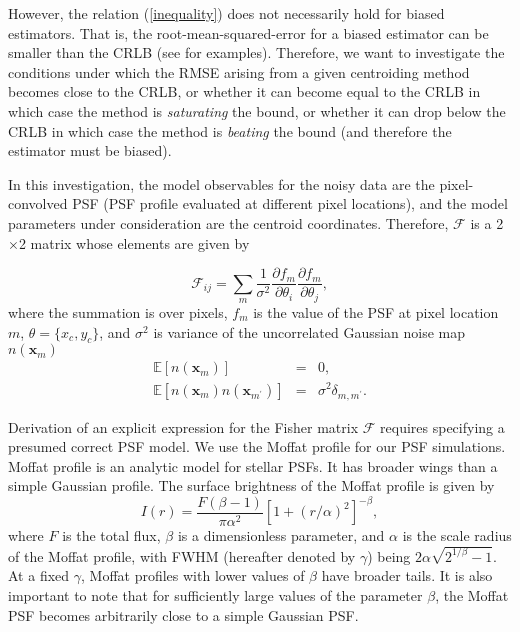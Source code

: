 \documentclass[12pt, preprint]{aastex}
\newcommand{\beq}{\begin{equation}}
\newcommand{\eeq}{\end{equation}}
\begin{document}
However, the relation (\ref{inequality}) does not necessarily hold for biased estimators. That is, 
the root-mean-squared-error for a biased estimator can be smaller than the CRLB (see \citealt{lecam} for examples).
Therefore, we want to investigate the conditions under which the RMSE arising from a given centroiding method 
becomes close to the CRLB, or whether it can become equal to the CRLB in which case the method is \emph{saturating} 
the bound, or whether it can drop below the CRLB in which case the method is \emph{beating} the bound (and therefore the estimator must be biased).   
  
In this investigation, the model observables for the noisy data are the pixel-convolved PSF (PSF profile evaluated at different pixel locations), and  
the model parameters under consideration are the centroid coordinates. Therefore, $\mathcal{F}$
is a 2$\times$2 matrix whose elements are given by

\beq
  \mathcal{F}_{ij} = \sum_{m}\frac{1}{\sigma^{2}}
                \frac{\partial f_{m}}{\partial \theta_{i}}\frac{\partial f_{m}}{\partial \theta_{j}},
\label{fish}
\eeq
where the summation is over pixels, $f_{m}$ is the value of the PSF at pixel location $m$,
$\theta=\{x_{c},y_{c}\}$, and $\sigma^{2}$ is variance of the uncorrelated Gaussian noise map $n(\mathbf{x}_{m})$
\begin{eqnarray}
\mathbb{E}[n(\mathbf{x}_{m})] &=& 0, \\
\mathbb{E}[n(\mathbf{x}_{m})n(\mathbf{x}_{m^{\prime}})] &=& \sigma^{2}\delta_{m,m^{\prime}}. 
\end{eqnarray}

Derivation of an explicit expression for the Fisher matrix $\mathcal{F}$ requires specifying a presumed correct 
PSF model.
We use the Moffat profile \citep{moffat} for our PSF simulations. 
Moffat profile is an analytic model for stellar PSFs. It has broader wings than
a simple Gaussian profile. The surface brightness of the Moffat profile is given by
\beq
I(r) = \frac{F(\beta -1)}{\pi \alpha^{2}}[1+(r/\alpha)^{2}]^{-\beta},
\label{mof}
\eeq
where $F$ is the total flux, $\beta$ is a dimensionless parameter, and $\alpha$ is
the scale radius of the Moffat profile, with FWHM (hereafter denoted by $\gamma$)
being $2\alpha\sqrt{2^{1/\beta}-1}$. At a fixed $\gamma$, Moffat profiles with lower values
of $\beta$ have broader tails. It is also important to note that for sufficiently large values of the 
parameter $\beta$, the Moffat PSF becomes arbitrarily close to a simple Gaussian PSF. 
 
\end{document}
